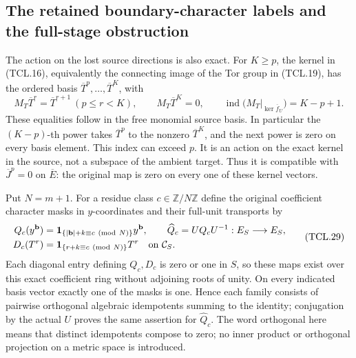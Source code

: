 \subsection{The retained boundary-character labels and the full-stage obstruction}

The action on the lost source directions is also exact. For
\(K\geq p\), the kernel in (TCL.16), equivalently the connecting
image of the Tor group in (TCL.19), has the ordered basis
\(\overline T^p,\ldots,\overline T^K\), with
\[
 M_T\overline T^r=\overline T^{r+1}\ (p\leq r<K),\qquad
 M_T\overline T^K=0,\qquad
 \operatorname{ind}\bigl(M_T|_{\ker\overline f_U}\bigr)=K-p+1.
 \tag{TCL.28}\label{CFStage:eq:tcl-tor-index}
\]
These equalities follow in the free monomial source basis. In
particular the \((K-p)\)-th power takes \(\overline T^p\)
to the nonzero \(\overline T^K\), and the next power is zero
on every basis element. This index can exceed \(p\). It is an
action on the exact kernel in the source, not a subspace of the
ambient target. Thus it is compatible with
\(\overline J^p=0\) on \(\overline E\): the original map is
zero on every one of these kernel vectors.

Put \(N=m+1\). For a residue class \(c\in\mathbb Z/N\mathbb Z\)
define the original coefficient character masks in \(y\)-coordinates
and their full-unit transports by
\[
 \begin{split}
 Q_c(y^{\mathbf b})&=
       \mathbf 1_{\{|\mathbf b|+k\equiv c\ ({\rm mod}\ N)\}}
                       y^{\mathbf b},\qquad
 \widehat Q_c=UQ_cU^{-1}:E_S\longrightarrow E_S,\\
 D_c(T^r)&=\mathbf 1_{\{r+k\equiv c\ ({\rm mod}\ N)\}}T^r
                       \quad\hbox{on }\mathcal C_S.
 \end{split}
 \tag{TCL.29}\label{CFStage:eq:tcl-character-mask}
\]
Each diagonal entry defining \(Q_c,D_c\) is zero or one in
\(S\), so these maps exist over this exact coefficient ring
without adjoining roots of unity. On every indicated basis vector
exactly one of the masks is one. Hence each family consists of
pairwise orthogonal algebraic idempotents summing to the identity;
conjugation by the actual \(U\) proves the same assertion for
\(\widehat Q_c\). The word orthogonal here means that distinct
idempotents compose to zero; no inner product or orthogonal
projection on a metric space is introduced.

